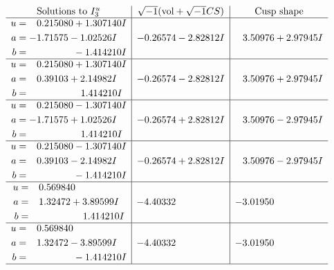 \documentclass[1p]{elsarticle_modified}
\theoremstyle{definition}
\newcommand{\I}{\sqrt{-1}}
\begin{document}
$$\begin{array}{c|c|c}  
\text{Solutions to }I^u_{3}& \I (\text{vol} + \sqrt{-1}CS) & \text{Cusp shape}\\
 \hline 
\begin{aligned}
u &= \phantom{-}0.215080 + 1.307140 I \\
a &= -1.71575 - 1.02526 I \\
b &= \phantom{-0.000000 } -1.414210 I\end{aligned}
 & -0.26574 - 2.82812 I & \phantom{-}3.50976 + 2.97945 I \\ \hline\begin{aligned}
u &= \phantom{-}0.215080 + 1.307140 I \\
a &= \phantom{-}0.39103 + 2.14982 I \\
b &= \phantom{-0.000000 -}1.414210 I\end{aligned}
 & -0.26574 - 2.82812 I & \phantom{-}3.50976 + 2.97945 I \\ \hline\begin{aligned}
u &= \phantom{-}0.215080 - 1.307140 I \\
a &= -1.71575 + 1.02526 I \\
b &= \phantom{-0.000000 -}1.414210 I\end{aligned}
 & -0.26574 + 2.82812 I & \phantom{-}3.50976 - 2.97945 I \\ \hline\begin{aligned}
u &= \phantom{-}0.215080 - 1.307140 I \\
a &= \phantom{-}0.39103 - 2.14982 I \\
b &= \phantom{-0.000000 } -1.414210 I\end{aligned}
 & -0.26574 + 2.82812 I & \phantom{-}3.50976 - 2.97945 I \\ \hline\begin{aligned}
u &= \phantom{-}0.569840\phantom{ +0.000000I} \\
a &= \phantom{-}1.32472 + 3.89599 I \\
b &= \phantom{-0.000000 -}1.414210 I\end{aligned}
 & -4.40332\phantom{ +0.000000I} & -3.01950\phantom{ +0.000000I} \\ \hline\begin{aligned}
u &= \phantom{-}0.569840\phantom{ +0.000000I} \\
a &= \phantom{-}1.32472 - 3.89599 I \\
b &= \phantom{-0.000000 } -1.414210 I\end{aligned}
 & -4.40332\phantom{ +0.000000I} & -3.01950\phantom{ +0.000000I}\\
 \hline 
 \end{array}$$\newpage
\end{document}
